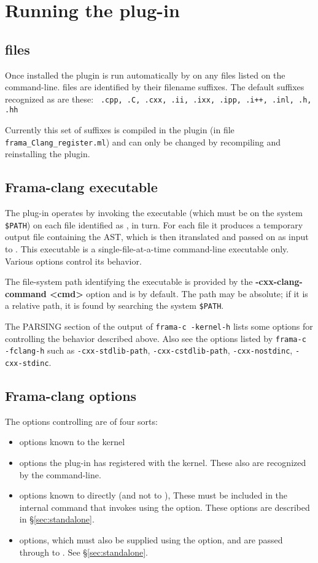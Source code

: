 \chapter{Running the plug-in}

\section{\cpp files}
Once installed the plugin is run automatically by \framac on any \cpp files listed on the command-line. \cpp files are identified by their filename suffixes. The default suffixes recognized as \cpp are these:
\lstinline| .cpp, .C, .cxx, .ii, .ixx, .ipp, .i++, .inl, .h, .hh|

Currently this set of suffixes is compiled in the plugin (in file \texttt{frama\_Clang\_register.ml}) and can only be changed by recompiling and
reinstalling the plugin.

\section{Frama-clang executable}
The plug-in operates by invoking the executable \irg (which must be on the system \verb|$PATH|)
on each file identified as \cpp, in turn. 
For each file it produces a temporary output file containing the \C AST, which is then itranslated and passed on as input to \framac. 
This executable is a single-file-at-a-time command-line executable only. 
Various options control its behavior.

The file-system path identifying the executable is provided by the \textbf{-cxx-clang-command <cmd>}
option and is \irg by default. The path may be absolute; if it is a relative path, it is found by searching the system \verb|$PATH|.


The PARSING section of the output of \lstinline|frama-c -kernel-h| lists some options for controlling the behavior described above. Also see the options listed by \lstinline|frama-c -fclang-h| such as \lstinline|-cxx-stdlib-path|, \lstinline|-cxx-cstdlib-path|, \lstinline|-cxx-nostdinc|, \lstinline|-cxx-stdinc|.

\section{Frama-clang options}

The options controlling \fclang are of four sorts:
\begin{itemize}
\item options known to the \framac kernel 
\item options the  \fclang plug-in has registered with the \framac kernel. These also are recognized by the \fc command-line.
\item options known to \irg directly (and not to \fc), These must be 
included in the internal command that invokes \irg using the  option. These options are described in \S\ref{sec:standalone}.
\item \clang options, which must also be supplied using the  option, and are passed through \irg to \cl. See \S\ref{sec:standalone}.
\end{itemize}

